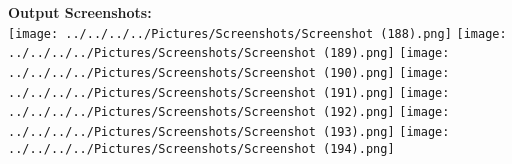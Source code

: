 \documentclass[12pt,a4 paper]{article}
\begin{document}
\textbf{Output Screenshots:}\\
\texttt{[image: ../../../../Pictures/Screenshots/Screenshot (188).png]} 
\texttt{[image: ../../../../Pictures/Screenshots/Screenshot (189).png]} 
\newline
\texttt{[image: ../../../../Pictures/Screenshots/Screenshot (190).png]}
\texttt{[image: ../../../../Pictures/Screenshots/Screenshot (191).png]} 
\texttt{[image: ../../../../Pictures/Screenshots/Screenshot (192).png]} 
\texttt{[image: ../../../../Pictures/Screenshots/Screenshot (193).png]} 
\texttt{[image: ../../../../Pictures/Screenshots/Screenshot (194).png]} 
\end{document}
